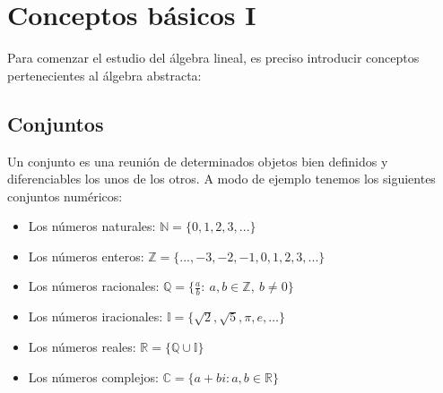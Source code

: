 \documentclass[0_algebra.tex]{subfiles}
\begin{document}

\chapter{Conceptos básicos I}
Para comenzar el estudio del álgebra lineal, es preciso introducir conceptos pertenecientes al álgebra abstracta:
\section{Conjuntos}
Un conjunto es una reunión de determinados objetos bien definidos y diferenciables los unos de los otros. A modo de ejemplo tenemos los siguientes conjuntos numéricos:

\begin{itemize}
\item Los números naturales: $\mathbb{N}=\lbrace 0,1,2,3,... \rbrace$
\item Los números enteros: $\mathbb{Z}=\lbrace ...,-3,-2,-1,0,1,2,3,... \rbrace$
\item Los números racionales: $\mathbb{Q}=\lbrace \frac{a}{b}:\ a,b\in \mathbb{Z},\ b\neq 0 \rbrace$
\item Los números iracionales: $\mathbb{I}=\lbrace \sqrt{2}, \sqrt{5}, \pi, e, \ldots  \rbrace$
\item Los números reales: $\mathbb{R}=\lbrace \mathbb{Q} \cup \mathbb{I}\rbrace$
\item Los números complejos: $\mathbb{C}=\lbrace a+bi: a,b\in \mathbb{R}\rbrace$
\end{itemize}
\end{document}
